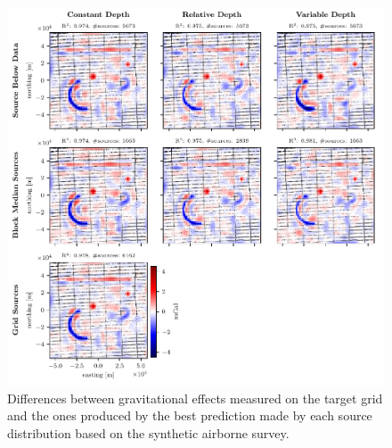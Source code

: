 \documentclass[twocolumn]{article}
\begin{document}
\begin{figure}
    \includegraphics[width=\linewidth]{figs/airborne_survey_differences.pdf}
    \caption{
        Differences between gravitational effects measured on the target grid
        and the ones produced by the best prediction made by each source
        distribution based on the synthetic airborne survey.
    }
    \label{fig:airborne-survey-differences}
\end{figure}
\end{document}
